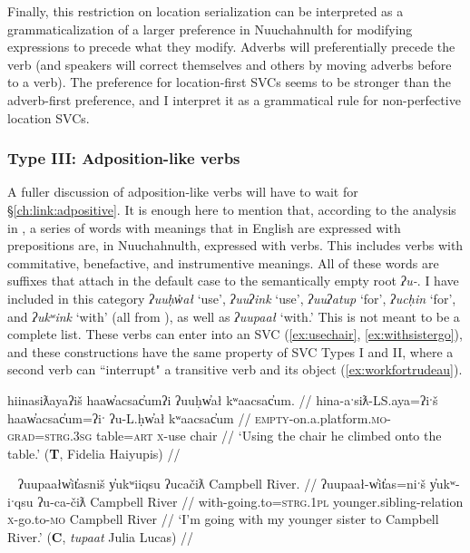 Finally, this restriction on location serialization can be interpreted as a grammaticalization of a larger preference in Nuuchahnulth for modifying expressions to precede what they modify. Adverbs will preferentially precede the verb (and speakers will correct themselves and others by moving adverbs before to a verb). The preference for location-first SVCs seems to be stronger than the adverb-first preference, and I interpret it as a grammatical rule for non-perfective location SVCs.

\vspace{10pt}

\subsubsection{Type III: Adposition-like verbs} \label{ch:sv:data:type3}

\vspace{10pt}

A fuller discussion of adposition-like verbs will have to wait for \S\ref{ch:link:adpositive}. It is enough here to mention that, according to the analysis in \citet{woo2007b}, a series of words with meanings that in English are expressed with prepositions are, in Nuuchahnulth, expressed with verbs. This includes verbs with commitative, benefactive, and instrumentive meanings. All of these words are suffixes that attach in the default case to the semantically empty root \textit{ʔu-}. I have included in this category \textit{ʔuuḥw̓ał} `use', \textit{ʔuuʔink} `use', \textit{ʔuuʔatup} `for', \textit{ʔucḥin} `for', and \textit{ʔukʷink} `with' (all from \citet[p.~15]{woo2007b}), as well as \textit{ʔuupaał} `with.' This is not meant to be a complete list. These verbs can enter into an SVC  (\ref{ex:usechair}, \ref{ex:withsistergo}), and these constructions have the same property of SVC Types I and II, where a second verb can ``interrupt" a transitive verb and its object (\ref{ex:workfortrudeau}).

\ex \label{ex:usechair}
\begingl
\glpreamble hiinasiƛayaʔiš haaw̓acsac̓umʔi ʔuuḥw̓ał kʷaacsac̓um. //
\gla hina-aˑsiƛ-LS.aya=ʔiˑš haaw̓acsac̓um=ʔiˑ ʔu-L.ḥw̓ał kʷaacsac̓um //
\glb \textsc{empty}-on.a.platform.\textsc{mo}-\textsc{grad}=\textsc{strg.3sg} table=\textsc{art} \textsc{x}-use chair //
\glft `Using the chair he climbed onto the table.' (\textbf{T}, Fidelia Haiyupis) //
\endgl
\xe

\ex~ \label{ex:withsistergo}
\begingl
\glpreamble ʔuupaałw̓it̓asniš y̓ukʷiiqsu ʔucačiƛ Campbell River. //
\gla ʔuupaał-w̓it̓as=niˑš y̓ukʷ-iˑqsu ʔu-ca-čiƛ Campbell River //
\glb with-going.to=\textsc{strg.1pl} younger.sibling-relation \textsc{x}-go.to-\textsc{mo} Campbell River //
\glft `I'm going with my younger sister to Campbell River.' (\textbf{C}, \textit{tupaat} Julia Lucas) //
\endgl
\xe

